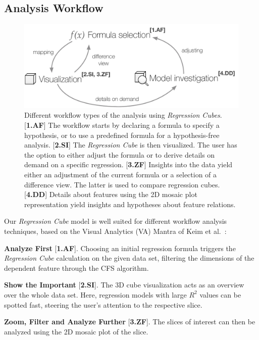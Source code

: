 \documentclass[journal]{style/vgtc} 			          %
\begin{document}
\subsection{Analysis Workflow} \label{sec:Workflow}
\begin{figure}[htb]
 \centering
 \includegraphics[width=1.0\linewidth]{figures/workflow}
 \caption{
 Different workflow types of the analysis using \emph{Regression Cubes}.
 [\textbf{1.AF}] The workflow starts by declaring a formula to specify a hypothesis, or to use a predefined formula for a hypothesis-free analysis.
 [\textbf{2.SI}] The \emph{Regression Cube} is then visualized.
 The user has the option to either adjust the formula or to derive details on demand on a specific regression.
 [\textbf{3.ZF}] Insights into the data yield either an adjustment of the current formula or a selection of a difference view.
 The latter is used to compare regression cubes.
 [\textbf{4.DD}] Details about features using the 2D mosaic plot representation yield insights and hypotheses about feature relations.
 }
  \label{fig:Workflow}
\end{figure}
\noindent Our \emph{Regression Cube} model is well suited for different workflow analysis techniques, based on the Visual Analytics (VA) Mantra of Keim et al.~\cite{Keim}:

\textbf{Analyze First} [\textbf{1.AF}]. Choosing an initial regression formula triggers the \emph{Regression Cube} calculation on the given data set, filtering the dimensions of the dependent feature through the CFS algorithm.

\textbf{Show the Important} [\textbf{2.SI}]. The 3D cube visualization acts as an overview over the whole data set.
Here, regression models with large $R^2$ values can be spotted fast, steering the user's attention to the respective slice.

\textbf{Zoom, Filter and Analyze Further} [\textbf{3.ZF}]. The slices of interest can then be analyzed using the 2D mosaic plot of the slice.
\end{document}
